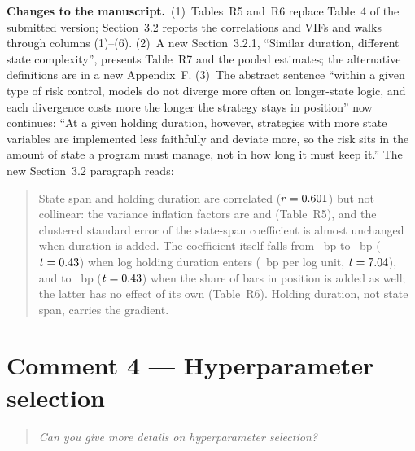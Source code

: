\documentclass[11pt,a4paper]{article}
\newenvironment{reviewer}{\par\medskip\noindent\begin{quote}\itshape}{\end{quote}\par}
\newcommand{\changes}{\par\medskip\noindent\textbf{Changes to the manuscript.}\ }
\newenvironment{newtext}{\par\medskip\noindent\begin{quote}\small\color{blue!60!black}}{\end{quote}\par}
\begin{document}
\changes (1)~Tables~R5 and~R6 replace Table~4 of the submitted version; Section~3.2 reports the correlations and VIFs and walks through columns (1)--(6). (2)~A new Section~3.2.1, ``Similar duration, different state complexity'', presents Table~R7 and the pooled estimates; the alternative definitions are in a new Appendix~F. (3)~The abstract sentence ``within a given type of risk control, models do not diverge more often on longer-state logic, and each divergence costs more the longer the strategy stays in position'' now continues: ``At a given holding duration, however, strategies with more state variables are implemented less faithfully and deviate more, so the risk sits in the amount of state a program must manage, not in how long it must keep it.'' The new Section~3.2 paragraph reads:
\begin{newtext}
State span and holding duration are correlated ($r=0.601$) but not collinear: the variance inflation factors are \RevVifTau{} and \RevVifDur{} (Table~R5), and the clustered standard error of the state-span coefficient is almost unchanged when duration is added. The coefficient itself falls from \RevRegBaseTau~bp to \RevRegDurOnlyTau~bp ($t=0.43$) when log holding duration enters (\RevRegDurOnlyDur~bp per log unit, $t=7.04$), and to \RevRegExpoTau~bp ($t=0.43$) when the share of bars in position is added as well; the latter has no effect of its own (Table~R6). Holding duration, not state span, carries the gradient.
\end{newtext}

\section*{Comment 4 --- Hyperparameter selection}
\begin{reviewer}
Can you give more details on hyperparameter selection?
\end{reviewer}
\end{document}
